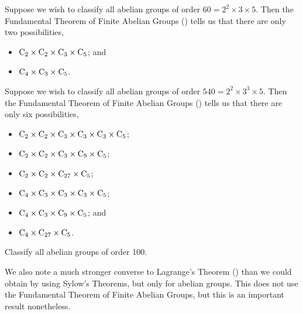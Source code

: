 \begin{example}
    Suppose we wish to classify all abelian groups of order $60 = 2^2 \times 3 \times 5$. Then the Fundamental Theorem of Finite Abelian Groups () tells us that there are only two possibilities,
    \begin{itemize}
        \item $\mathrm{C}_{2} \times \mathrm{C}_{2} \times \mathrm{C}_{3} \times \mathrm{C}_{5}$; and
        \item $\mathrm{C}_{4} \times \mathrm{C}_{3} \times \mathrm{C}_{5}$.
    \end{itemize}
\end{example}

\begin{example}
    Suppose we wish to classify all abelian groups of order $540 = 2^2 \times 3^3 \times 5$. Then the Fundamental Theorem of Finite Abelian Groups () tells us that there are only six possibilities,
    \begin{itemize}
        \item $\mathrm{C}_{2} \times \mathrm{C}_{2} \times \mathrm{C}_{3} \times \mathrm{C}_{3} \times \mathrm{C}_{3} \times \mathrm{C}_{5}$;
        \item $\mathrm{C}_{2} \times \mathrm{C}_{2} \times \mathrm{C}_{3} \times \mathrm{C}_{9} \times \mathrm{C}_{5}$;
        \item $\mathrm{C}_{2} \times \mathrm{C}_{2} \times \mathrm{C}_{27} \times \mathrm{C}_{5}$;
        \item $\mathrm{C}_{4} \times \mathrm{C}_{3} \times \mathrm{C}_{3} \times \mathrm{C}_{3} \times \mathrm{C}_{5}$;
        \item $\mathrm{C}_{4} \times \mathrm{C}_{3} \times \mathrm{C}_{9} \times \mathrm{C}_{5}$; and
        \item $\mathrm{C}_{4} \times \mathrm{C}_{27} \times \mathrm{C}_{5}$.
    \end{itemize}
\end{example}

\begin{exercise}
    Classify all abelian groups of order 100.
\end{exercise}

We also note a much stronger converse to Lagrange's Theorem () than we could obtain by using Sylow's Theorems, but only for abelian groups. This does not use the Fundamental Theorem of Finite Abelian Groups, but this is an important result nonetheless.

